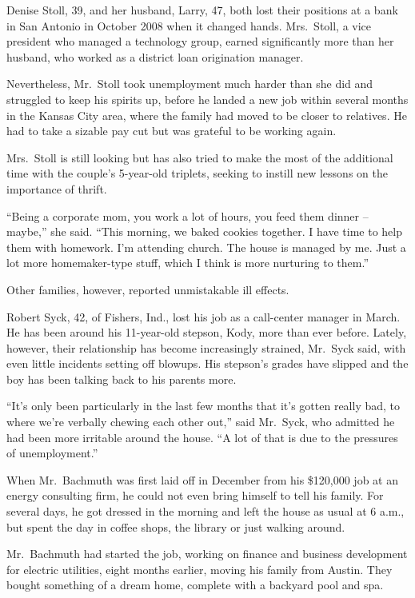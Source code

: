 ﻿\documentclass[12pt]{article}
\begin{document}
Denise Stoll, 39, and her husband, Larry, 47, both lost their positions at a bank in San Antonio in
October 2008 when it changed hands. Mrs.~Stoll, a vice president who managed a technology group,
earned significantly more than her husband, who worked as a district loan origination manager.

Nevertheless, Mr.~Stoll took unemployment much harder than she did and struggled to keep his spirits
up, before he landed a new job within several months in the Kansas City area, where the family had
moved to be closer to relatives. He had to take a sizable pay cut but was grateful to be working
again.

Mrs.~Stoll is still looking but has also tried to make the most of the additional time with the
couple's 5-year-old triplets, seeking to instill new lessons on the importance of thrift.

``Being a corporate mom, you work a lot of hours, you feed them dinner -- maybe,'' she said. ``This
morning, we baked cookies together. I have time to help them with homework. I'm attending church.
The house is managed by me. Just a lot more homemaker-type stuff, which I think is more nurturing to
them.''

Other families, however, reported unmistakable ill effects.

Robert Syck, 42, of Fishers, Ind., lost his job as a call-center manager in March. He has been
around his 11-year-old stepson, Kody, more than ever before. Lately, however, their relationship has
become increasingly strained, Mr.~Syck said, with even little incidents setting off blowups. His
stepson's grades have slipped and the boy has been talking back to his parents more.

``It's only been particularly in the last few months that it's gotten really bad, to where we're
verbally chewing each other out,'' said Mr.~Syck, who admitted he had been more irritable around the
house. ``A lot of that is due to the pressures of unemployment.''

When Mr.~Bachmuth was first laid off in December from his \$120,000 job at an energy consulting
firm, he could not even bring himself to tell his family. For several days, he got dressed in the
morning and left the house as usual at 6 a.m., but spent the day in coffee shops, the library or
just walking around.

Mr.~Bachmuth had started the job, working on finance and business development for electric
utilities, eight months earlier, moving his family from Austin. They bought something of a dream
home, complete with a backyard pool and spa.
\end{document}
